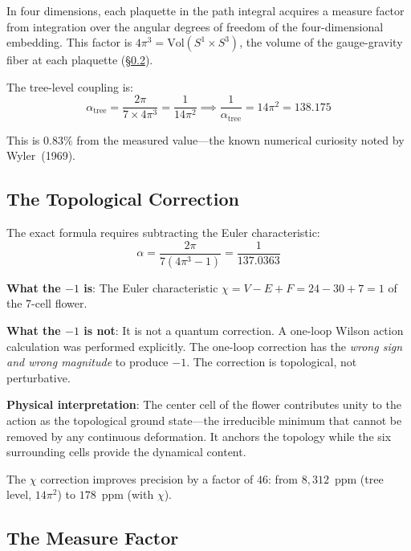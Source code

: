 \documentclass[12pt,a4paper]{article}
\theoremstyle{plain}
\theoremstyle{definition}
\begin{document}
In four dimensions, each plaquette in the path integral acquires a measure factor from integration over the angular degrees of freedom of the four-dimensional embedding. This factor is $4\pi^3 = \mathrm{Vol}(S^1 \times S^3)$, the volume of the gauge-gravity fiber at each plaquette (\S\ref{sec:measure}).

The tree-level coupling is:
\begin{equation}
\alpha_{\mathrm{tree}} = \frac{2\pi}{7 \times 4\pi^3} = \frac{1}{14\pi^2} \implies \frac{1}{\alpha_{\mathrm{tree}}} = 14\pi^2 = 138.175
\end{equation}

This is $0.83\%$ from the measured value---the known numerical curiosity noted by Wyler~(1969).

\subsection{The Topological Correction}

The exact formula requires subtracting the Euler characteristic:
\begin{equation}\label{eq:master}
\boxed{\alpha = \frac{2\pi}{7(4\pi^3 - 1)} = \frac{1}{137.0363}}
\end{equation}

\textbf{What the $-1$ is}: The Euler characteristic $\chi = V - E + F = 24 - 30 + 7 = 1$ of the 7-cell flower.

\textbf{What the $-1$ is not}: It is not a quantum correction. A one-loop Wilson action calculation was performed explicitly. The one-loop correction has the \emph{wrong sign and wrong magnitude} to produce $-1$. The correction is topological, not perturbative.

\textbf{Physical interpretation}: The center cell of the flower contributes unity to the action as the topological ground state---the irreducible minimum that cannot be removed by any continuous deformation. It anchors the topology while the six surrounding cells provide the dynamical content.

The $\chi$ correction improves precision by a factor of $46$: from $8{,}312$~ppm (tree level, $14\pi^2$) to $178$~ppm (with $\chi$).

\subsection{The Measure Factor}\label{sec:measure}
\end{document}
